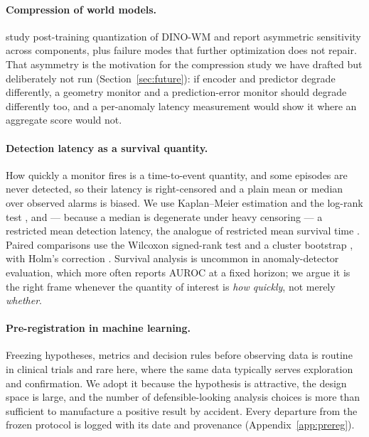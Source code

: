 \paragraph{Compression of world models.}
\citet{fu2026quantization} study post-training quantization of DINO-WM and
report asymmetric sensitivity across components, plus failure modes that further
optimization does not repair. That asymmetry is the motivation for the
compression study we have drafted but deliberately not run
(Section~\ref{sec:future}): if encoder and predictor degrade differently, a
geometry monitor and a prediction-error monitor should degrade differently too,
and a per-anomaly latency measurement would show it where an aggregate score
would not.

\paragraph{Detection latency as a survival quantity.}
How quickly a monitor fires is a time-to-event quantity, and some episodes are
never detected, so their latency is right-censored and a plain mean or median
over observed alarms is biased. We use Kaplan--Meier estimation
\citep{kaplan1958nonparametric} and the log-rank test
\citep{mantel1966evaluation}, and --- because a median is degenerate under heavy
censoring --- a restricted mean detection latency, the analogue of restricted
mean survival time \citep{royston2013restricted}. Paired comparisons use the
Wilcoxon signed-rank test \citep{wilcoxon1945individual} and a cluster bootstrap
\citep{efron1979bootstrap}, with Holm's correction \citep{holm1979simple}.
Survival analysis is uncommon in anomaly-detector evaluation, which more often
reports AUROC at a fixed horizon; we argue it is the right frame whenever the
quantity of interest is \emph{how quickly}, not merely \emph{whether}.

\paragraph{Pre-registration in machine learning.}
Freezing hypotheses, metrics and decision rules before observing data is routine
in clinical trials and rare here, where the same data typically serves
exploration and confirmation. We adopt it because the hypothesis is attractive,
the design space is large, and the number of defensible-looking analysis choices
is more than sufficient to manufacture a positive result by accident. Every
departure from the frozen protocol is logged with its date and provenance
(Appendix~\ref{app:prereg}).
